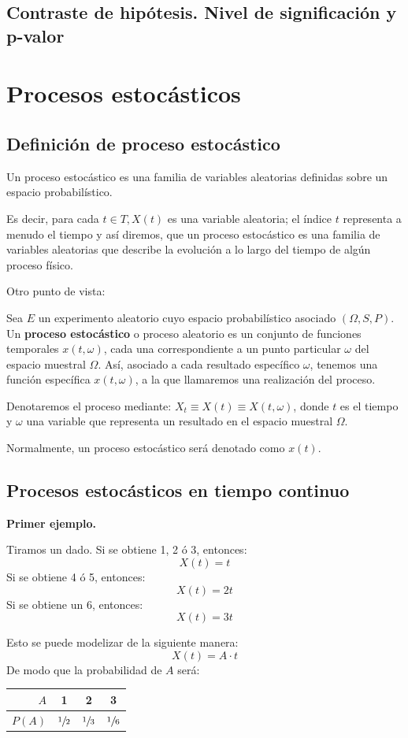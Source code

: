 \documentclass[a4paper]{book}
\begin{document}
\section{Contraste de hipótesis. Nivel de significación y p-valor}



\chapter{Procesos estocásticos}

\section{Definición de proceso estocástico}
Un proceso estocástico es una familia de variables aleatorias definidas sobre un espacio probabilístico.

Es decir, para cada $ t\in T, X(t)$ es una variable aleatoria; el índice $t$ representa a menudo el tiempo y así diremos, que un proceso estocástico es una familia de variables aleatorias que describe la evolución a lo largo del tiempo de algún proceso físico.

Otro punto de vista:

Sea $E$ un experimento aleatorio cuyo espacio probabilístico asociado $(\Omega , S, P)$. Un \textbf{proceso estocástico} o proceso aleatorio es un conjunto de funciones temporales $x(t,\omega )$, cada una correspondiente a un punto particular $\omega$ del espacio muestral $\Omega$. Así, asociado a cada resultado específico $\omega$, tenemos una función específica $x(t,\omega )$, a la que llamaremos una realización del proceso.

Denotaremos el proceso mediante: $X_t\equiv X(t) \equiv X(t,\omega )$, donde $t$ es el tiempo y $\omega$ una variable que representa un resultado en el espacio muestral $\Omega$.

Normalmente, un proceso estocástico será denotado como $x(t)$.

\section{Procesos estocásticos en tiempo continuo}
\textbf{Primer ejemplo.}

Tiramos un dado. Si se obtiene 1, 2 ó 3, entonces:
\[X(t) = t\]
Si se obtiene 4 ó 5, entonces:
\[X(t) = 2t\]
Si se obtiene un 6, entonces:
\[X(t) = 3t\]

Esto se puede modelizar de la siguiente manera:
\[X(t) = A\cdot t\]
De modo que la probabilidad de $A$ será:
\begin{center}
	\begin{tabular}{r || c | c | c}
		$A$    & 1              & 2              & 3              \\ \hline
		$P(A)$ & $\sfrac{1}{2}$ & $\sfrac{1}{3}$ & $\sfrac{1}{6}$
	\end{tabular}
\end{center}
\end{document}
